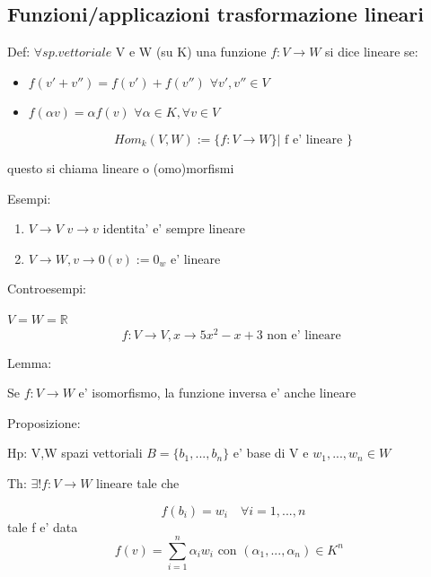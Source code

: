 \documentclass{article}
\begin{document}
\subsection{Funzioni/applicazioni trasformazione lineari}
\begin{flushleft}
  Def: $\forall sp.vettoriale$ V e W (su K) una funzione $f: V \to W$ si dice lineare se:
\end{flushleft}
\begin{itemize}
  \item $f(v'+v'')=f(v')+f(v'')$ $\forall v',v'' \in V$
  \item $f(\alpha v)=\alpha f(v)$ $\forall \alpha \in K, \forall v \in V$
\end{itemize}
\begin{equation*}
  Hom_k(V,W):=\{ f:V \to W \} | \text{ f e' lineare } \}
\end{equation*}
\begin{flushleft}
  questo si chiama lineare o (omo)morfismi
\end{flushleft}
Esempi:
\begin{flushleft}
  \begin{enumerate}
    \item $V \to V$ $v \to v$ identita' e' sempre lineare
    \item $V \to W, v\to 0(v):= 0_w$ e' lineare
  \end{enumerate}
\end{flushleft}
Controesempi:
\begin{flushleft}
\item $V=W=\mathbb{R}$
  \begin{equation*}
    f:V \to V, x\to 5x^2-x+3 \text{ non e' lineare }
  \end{equation*}
\end{flushleft}
Lemma:
\begin{flushleft}
  Se $f: V \to W$ e' isomorfismo, la funzione inversa e' anche lineare
\end{flushleft}
Proposizione:
\begin{flushleft}
  Hp: V,W spazi vettoriali $B = \{b_1,...,b_n \}$ e' base di V e $w_1,...,w_n \in W$
\end{flushleft}
\begin{flushleft}
  Th: $\exists ! f: V \to W$ lineare tale che 
\end{flushleft}
\begin{equation*}
  f(b_i)=w_i \quad \forall i=1,...,n
\end{equation*}
tale f e' data
\begin{equation*}
  f(v)= \sum^n_{i=1} \alpha_i w_i \text{ con $(\alpha_1,...,\alpha_n) \in K^n$ }
\end{equation*}
\end{document}
